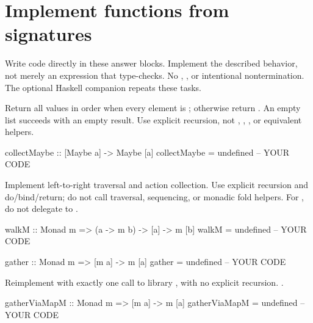 \chapter{Implement functions from signatures}
Write code directly in these answer blocks. Implement the described behavior,
not merely an expression that type-checks. No , ,
or intentional nontermination. The optional Haskell companion repeats these tasks.

Return all values in order when every element is ; otherwise return
. An empty list succeeds with an empty result. Use explicit
recursion, not , , , or equivalent helpers.
\par\noindent\begin{minipage}{\linewidth}
\begin{codeanswer}
collectMaybe :: [Maybe a] -> Maybe [a]
collectMaybe = undefined  -- YOUR CODE
\end{codeanswer}
\end{minipage}\par
{}

Implement left-to-right traversal and action collection. Use explicit recursion
and do/bind/return; do not call traversal, sequencing, or monadic fold helpers.
For , do not delegate to .
\par\noindent\begin{minipage}{\linewidth}
\begin{codeanswer}
walkM :: Monad m => (a -> m b) -> [a] -> m [b]
walkM = undefined  -- YOUR CODE

gather :: Monad m => [m a] -> m [a]
gather = undefined  -- YOUR CODE
\end{codeanswer}
\end{minipage}\par

Reimplement  with exactly one call to library , with no
explicit recursion. .
\par\noindent\begin{minipage}{\linewidth}
\begin{codeanswer}
gatherViaMapM :: Monad m => [m a] -> m [a]
gatherViaMapM = undefined  -- YOUR CODE
\end{codeanswer}
\end{minipage}\par
{}


